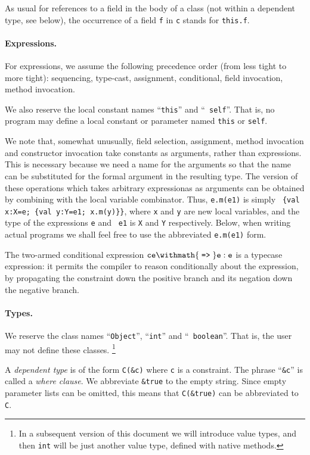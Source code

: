 \documentclass{article}
\def\implies{\withmath{\;\mbox{\tt =>}\;}}
\begin{document}
As usual for references to a field in the body of a class (not within
a dependent type, see below), the occurrence of a field {\tt f} in
{\tt c} stands for {\tt this.f}.

\paragraph{Expressions.}
For expressions, we assume the following precedence order (from less
tight to more tight): sequencing, type-cast, assignment, conditional,
field invocation, method invocation.

We also reserve the local constant names ``{\tt this}'' and ``{\tt
self}''. That is, no program may define a local constant or parameter
named {\tt this} or {\tt self}. 

We note that, somewhat unusually, field selection, assignment, method
invocation and constructor invocation take constants as arguments,
rather than expressions. This is necessary because we need a name for
the arguments so that the name can be substituted for the formal
argument in the resulting type. The version of these operations which
takes arbitrary expressionas as arguments can be obtained by combining
with the local variable combinator. Thus, {\tt e.m(e1)} is simply {\tt
\{val x:X=e; \{val y:Y=e1; x.m(y)\}\}}, where {\tt x} and {\tt y} are
new local variables, and the type of the expressions {\tt e} and {\tt
e1} is {\tt X} and {\tt Y} respectively. Below, when writing actual
programs we shall feel free to use the abbreviated {\tt e.m(e1)} form.

The two-armed conditional expression $\tt ce \implies e : e$ is a
typecase expression: it permits the compiler to reason conditionally
about the expression, by propagating the constraint down the positive
branch and its negation down the negative branch.

\paragraph{Types.}
We reserve the class names ``{\tt Object}'', ``{\tt int}'' and ``{\tt
boolean}''. That is, the user may not define these
classes. \footnote{In a subsequent version of this document we will
introduce value types, and then {\tt int} will be just another value
type, defined with native methods.}

A {\em dependent type} is of the form {\tt C(\&c)} where {\tt c} is a
constraint.  The phrase ``{\tt \&c}'' is called a {\em where
clause}. We abbreviate {\tt \&true} to the empty string. Since
empty parameter lists can be omitted, this means that {\tt C(\&true)}
can be abbreviated to {\tt C}.
\end{document}
